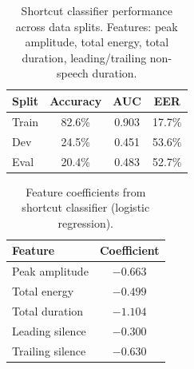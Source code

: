 
\begin{table}[h]
\centering
\caption{Shortcut classifier performance across data splits. Features: peak amplitude, total energy, total duration, leading/trailing non-speech duration.}
\label{tab:shortcut-classifier}
\begin{tabular}{lccc}
\toprule
\textbf{Split} & \textbf{Accuracy} & \textbf{AUC} & \textbf{EER} \\
\midrule
Train & 82.6\% & 0.903 & 17.7\% \\
Dev   & 24.5\% & 0.451 & 53.6\% \\
Eval  & 20.4\% & 0.483 & 52.7\% \\
\bottomrule
\end{tabular}
\end{table}

\begin{table}[h]
\centering
\caption{Feature coefficients from shortcut classifier (logistic regression).}
\label{tab:shortcut-coefficients}
\begin{tabular}{lc}
\toprule
\textbf{Feature} & \textbf{Coefficient} \\
\midrule
Peak amplitude     & $-0.663$ \\
Total energy       & $-0.499$ \\
Total duration     & $-1.104$ \\
Leading silence    & $-0.300$ \\
Trailing silence   & $-0.630$ \\
\bottomrule
\end{tabular}
\end{table}

